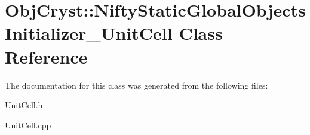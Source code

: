 \hypertarget{class_obj_cryst_1_1_nifty_static_global_objects_initializer___unit_cell}{}\section{Obj\+Cryst\+::Nifty\+Static\+Global\+Objects\+Initializer\+\_\+\+Unit\+Cell Class Reference}
\label{class_obj_cryst_1_1_nifty_static_global_objects_initializer___unit_cell}


The documentation for this class was generated from the following files\+:\begin{DoxyCompactItemize}
\item 
Unit\+Cell.\+h\item 
Unit\+Cell.\+cpp\end{DoxyCompactItemize}
